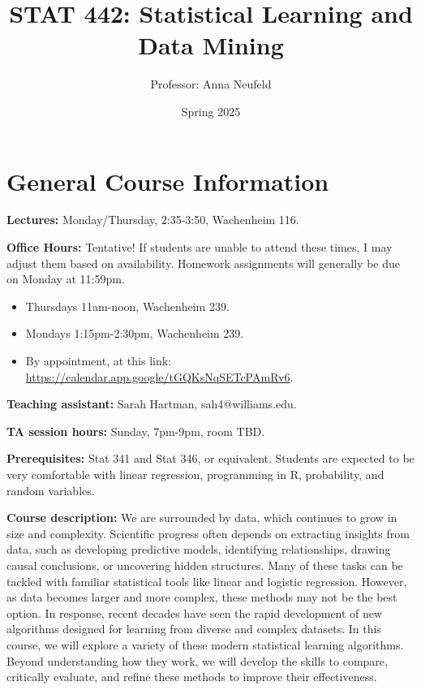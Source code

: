 \documentclass[11pt]{article}
\title{STAT 442: Statistical Learning and Data Mining}
\author{Professor: Anna Neufeld}
\date{Spring 2025}
\begin{document}
\maketitle

\noindent\makebox[\linewidth]{\rule{\textwidth}{0.4pt}}


\section{General Course Information}
\begin{list}{}{}
\item[\textbf{Lectures:}] Monday/Thursday, 2:35-3:50, Wachenheim 116.
\item[\textbf{Office Hours:}]  Tentative! If students are unable to attend these times, I may adjust them based on availability. Homework assignments will generally be due on Monday at 11:59pm. 
\begin{itemize}
\item Thursdays 11am-noon, Wachenheim 239. 
\item Mondays 1:15pm-2:30pm, Wachenheim 239. 
\item By appointment, at this link: \href{https://calendar.app.google/tGQKsNqSETcPAmRv6}{https://calendar.app.google/tGQKsNqSETcPAmRv6}. 
\end{itemize}
\item[\textbf{Teaching assistant:}] Sarah Hartman, sah4@williams.edu.
\item[\textbf{TA session hours:}] Sunday, 7pm-9pm, room TBD. 
\item[\textbf{Prerequisites:}] Stat 341 and Stat 346, or equivalent. Students are expected to be very comfortable with linear regression, programming in R, probability, and random variables.  
 
\item[\textbf{Course description:}] We are surrounded by data, which continues to grow in size and complexity. Scientific progress often depends on extracting insights from data, such as developing predictive models, identifying relationships, drawing causal conclusions, or uncovering hidden structures. Many of these tasks can be tackled with familiar statistical tools like linear and logistic regression. However, as data becomes larger and more complex, these methods may not be the best option. In response, recent decades have seen the rapid development of new algorithms designed for learning from diverse and complex datasets. In this course, we will explore a variety of these modern statistical learning algorithms. Beyond understanding how they work, we will develop the skills to compare, critically evaluate, and refine these methods to improve their effectiveness. 


\end{list}
\end{document}
